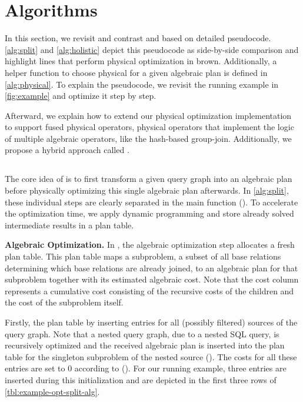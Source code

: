 \section{Algorithms}
\label{sec:impl}

In this section, we revisit and contrast  \split and \holistic based on detailed pseudocode.  \autoref{alg:split} and \autoref{alg:holistic} depict this pseudocode as side-by-side comparison and highlight lines that perform physical optimization in brown.  Additionally, a helper function to choose physical  for a given algebraic plan is defined in \autoref{alg:physical}.  To explain the pseudocode, we revisit the running example in \autoref{fig:example} and optimize it step by step.

Afterward, we explain how to extend our physical optimization implementation to support fused physical operators, \ie physical operators that implement the logic of multiple algebraic operators, like the hash-based group-join.  Additionally, we propose a hybrid approach called \topk.

\subsection{\split}
\label{sec:impl-split}

The core idea of \split is to first transform a given query graph into an algebraic plan before physically optimizing this single algebraic plan afterwards.  In \autoref{alg:split}, these individual steps are clearly separated in the main function  ().  To accelerate the optimization time, we apply dynamic programming and store already solved intermediate results in a plan table.

\textbf{Algebraic Optimization.}
In , the algebraic optimization step allocates a fresh plan table.  This plan table maps a subproblem, \ie a subset of all base relations determining which base relations are already joined, to an algebraic plan for that subproblem together with its estimated algebraic cost.   Note that the cost column represents a cumulative cost consisting of the recursive costs of the children and the cost of the subproblem itself.

Firstly,   the plan table by inserting entries for all (possibly filtered) sources of the query graph.  Note that a nested query graph, \eg due to a nested SQL query, is recursively optimized and the received algebraic plan is inserted into the plan table for the singleton subproblem of the nested source ().  The costs for all these entries are set to 0 according to \Cout ().  For our running example, three entries are inserted during this initialization and are depicted in the first three rows of \autoref{tbl:example-opt-split-alg}.

